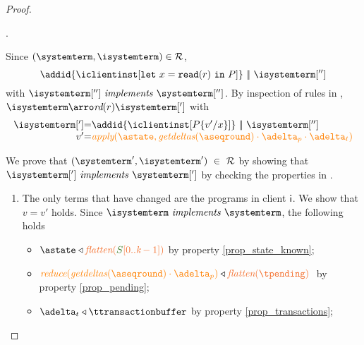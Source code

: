 \begin{proof}
\begin{itemize}
\begin{itemize}
				.
				
				Since $(\systemterm,\isystemterm)\in \mathcal{R}$,
				\[ \addid{\iclientinst[\treadins{x}{r}]} \ \bigpar \ \isystemterm['']\]
				with $\implements{\isystemterm['']}{\systemterm['']}$. By inspection of rules in \figref{}, 
				$\isystemterm \arroi{\readtran{r}} \isystemterm[']$ with
				\[\begin{array}{r@{=}l}
					\isystemterm['] & \addid{\iclientinst[{P}\subst{x}{v'}]}\ \bigpar \ \isystemterm['']	\\
					v' & \iapply{\known}{{\igetdeltas\pending}\cdot{\pushbuffer}\cdot{\transactionbuffer}}
				  \end{array}		
				\]
				
				We  prove that $(\systemterm',\isystemterm') \ \in \ \mathcal{R}$ by showing that $\implements{\isystemterm[']}{\systemterm[']}$ 
				by checking the properties in .			
					\begin{enumerate}
						\item The only terms that have changed are the programs in client ${\sf i}$.  We show that $v=v'$ holds. Since 
						$\implements{\isystemterm}{\systemterm}$, the following holds
						\begin{itemize}
							\item $\known \triangleleft \flatten {\queuemessage[0..\tknown-1]}$ by property \ref{prop_state_known};
							\item $\ireduce{\igetdeltas{\pending}\cdot{\pushbuffer}}\triangleleft \flatten{\tpending} \ $ by property \ref{prop_pending};
							\item $\transactionbuffer \triangleleft{\ttransactionbuffer}$ by property \ref{prop_transactions};
						\end{itemize}
						

\end{enumerate}
\end{itemize}
\end{itemize}
\end{proof}
